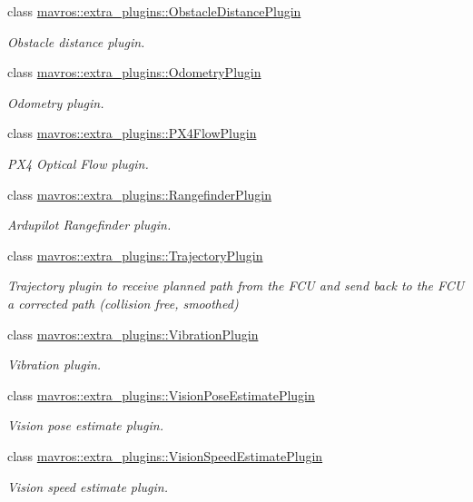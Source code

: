 \begin{DoxyCompactItemize}
class \mbox{\hyperlink{classmavros_1_1extra__plugins_1_1ObstacleDistancePlugin}{mavros\+::extra\+\_\+plugins\+::\+Obstacle\+Distance\+Plugin}}
\begin{DoxyCompactList}\small\item\em Obstacle distance plugin. \end{DoxyCompactList}\item 
class \mbox{\hyperlink{classmavros_1_1extra__plugins_1_1OdometryPlugin}{mavros\+::extra\+\_\+plugins\+::\+Odometry\+Plugin}}
\begin{DoxyCompactList}\small\item\em Odometry plugin. \end{DoxyCompactList}\item 
class \mbox{\hyperlink{classmavros_1_1extra__plugins_1_1PX4FlowPlugin}{mavros\+::extra\+\_\+plugins\+::\+P\+X4\+Flow\+Plugin}}
\begin{DoxyCompactList}\small\item\em P\+X4 Optical Flow plugin. \end{DoxyCompactList}\item 
class \mbox{\hyperlink{classmavros_1_1extra__plugins_1_1RangefinderPlugin}{mavros\+::extra\+\_\+plugins\+::\+Rangefinder\+Plugin}}
\begin{DoxyCompactList}\small\item\em Ardupilot Rangefinder plugin. \end{DoxyCompactList}\item 
class \mbox{\hyperlink{classmavros_1_1extra__plugins_1_1TrajectoryPlugin}{mavros\+::extra\+\_\+plugins\+::\+Trajectory\+Plugin}}
\begin{DoxyCompactList}\small\item\em Trajectory plugin to receive planned path from the F\+CU and send back to the F\+CU a corrected path (collision free, smoothed) \end{DoxyCompactList}\item 
class \mbox{\hyperlink{classmavros_1_1extra__plugins_1_1VibrationPlugin}{mavros\+::extra\+\_\+plugins\+::\+Vibration\+Plugin}}
\begin{DoxyCompactList}\small\item\em Vibration plugin. \end{DoxyCompactList}\item 
class \mbox{\hyperlink{classmavros_1_1extra__plugins_1_1VisionPoseEstimatePlugin}{mavros\+::extra\+\_\+plugins\+::\+Vision\+Pose\+Estimate\+Plugin}}
\begin{DoxyCompactList}\small\item\em Vision pose estimate plugin. \end{DoxyCompactList}\item 
class \mbox{\hyperlink{classmavros_1_1extra__plugins_1_1VisionSpeedEstimatePlugin}{mavros\+::extra\+\_\+plugins\+::\+Vision\+Speed\+Estimate\+Plugin}}
\begin{DoxyCompactList}\small\item\em Vision speed estimate plugin. \end{DoxyCompactList}\end{DoxyCompactItemize}
